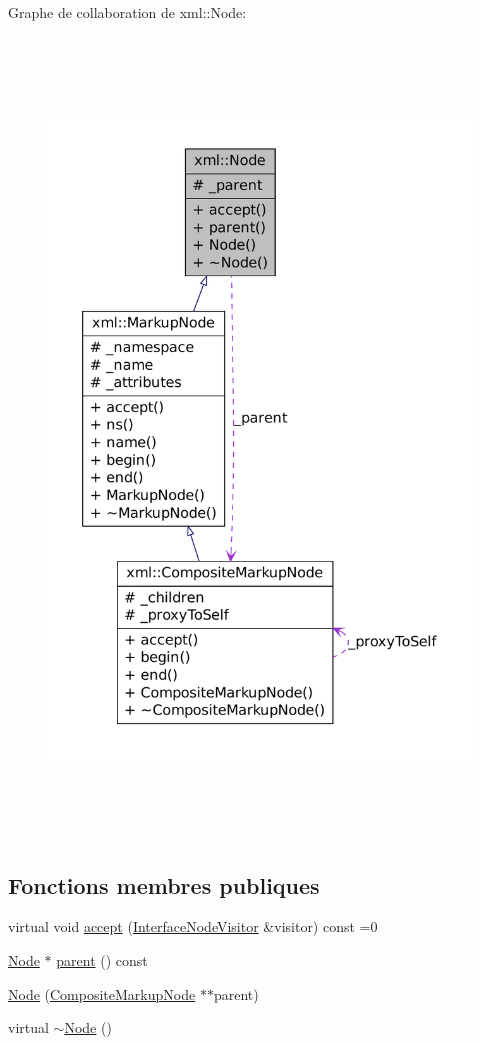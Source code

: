 Graphe de collaboration de xml::Node:\nopagebreak
\begin{figure}[H]
\begin{center}
\leavevmode
\includegraphics[height=600pt]{classxml_1_1_node__coll__graph}
\end{center}
\end{figure}
\subsection*{Fonctions membres publiques}
\begin{DoxyCompactItemize}
\item 
virtual void \hyperlink{classxml_1_1_node_a332d84602db92c390e57eeec79c4b02d}{accept} (\hyperlink{classxml_1_1_interface_node_visitor}{InterfaceNodeVisitor} \&visitor) const =0
\item 
\hyperlink{classxml_1_1_node}{Node} $\ast$ \hyperlink{classxml_1_1_node_a7b316f796ec1a98f127b6f9e0802b579}{parent} () const 
\item 
\hyperlink{classxml_1_1_node_a79b919ce53463d9b63ad38b6bb934c63}{Node} (\hyperlink{classxml_1_1_composite_markup_node}{CompositeMarkupNode} $\ast$$\ast$parent)
\item 
virtual \hyperlink{classxml_1_1_node_a4529378ae3f081120e846c9d44154f92}{$\sim$Node} ()
\end{DoxyCompactItemize}
